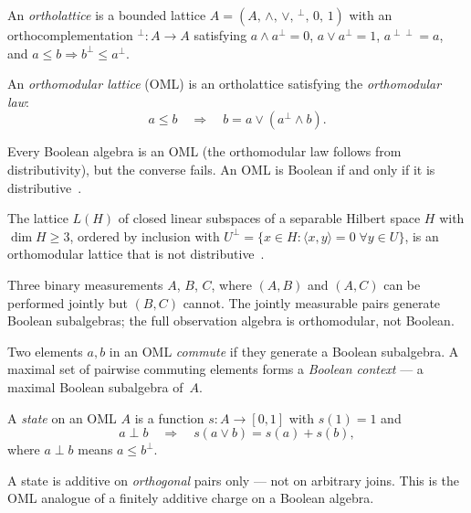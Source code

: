 \begin{definition}
An \emph{ortholattice} is a bounded lattice
$A = (A,\, \wedge,\, \vee,\, {}^\perp,\, 0,\, 1)$ with an
orthocomplementation ${}^\perp : A \to A$ satisfying
$a \wedge a^\perp = 0$, \; $a \vee a^\perp = 1$, \;
$a^{\perp\perp} = a$, and \; $a \leq b \Rightarrow b^\perp \leq a^\perp$.
\end{definition}

\begin{definition}
An \emph{orthomodular lattice} (OML) is an ortholattice satisfying
the \emph{orthomodular law}:
\[
  a \leq b
  \quad\Longrightarrow\quad
  b = a \vee (a^\perp \wedge b).
\]
\end{definition}

\noindent Every Boolean algebra is an OML (the orthomodular law
follows from distributivity), but the converse fails.  An OML is
Boolean if and only if it is
distributive~\cite[Proposition~2.3]{McDonaldBimbo2023}.

\begin{example}
The lattice $L(H)$ of closed linear subspaces of a separable Hilbert
space $H$ with $\dim H \geq 3$, ordered by inclusion with
$U^\perp = \{x \in H : \langle x, y \rangle = 0 \;\forall y \in U\}$,
is an orthomodular lattice that is not
distributive~\cite[Chapter~1]{Kalmbach1983}.
\end{example}

\begin{example}
Three binary measurements $A$, $B$, $C$, where $(A,B)$ and $(A,C)$
can be performed jointly but $(B,C)$ cannot.  The jointly measurable
pairs generate Boolean subalgebras; the full observation algebra is
orthomodular, not Boolean.
\end{example}

Two elements $a, b$ in an OML \emph{commute} if they generate a
Boolean subalgebra.  A maximal set of pairwise commuting elements
forms a \emph{Boolean context} --- a maximal Boolean subalgebra
of~$A$.

\begin{definition}
A \emph{state} on an OML $A$ is a function $s : A \to [0,1]$ with
$s(1) = 1$ and
\[
  a \perp b
  \quad\Longrightarrow\quad
  s(a \vee b) = s(a) + s(b),
\]
where $a \perp b$ means $a \leq b^\perp$.
\end{definition}

\noindent A state is additive on \emph{orthogonal} pairs only ---
not on arbitrary joins.  This is the OML analogue of a finitely
additive charge on a Boolean algebra.

